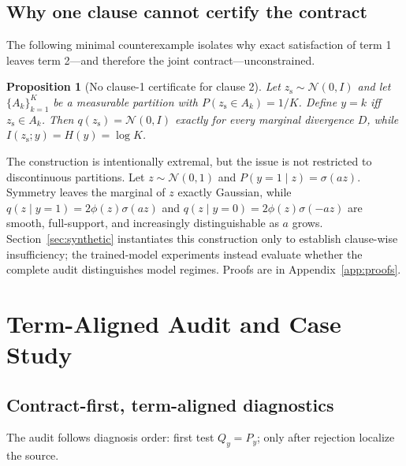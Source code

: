 \documentclass{article}
\newtheorem{proposition}{Proposition}
\newcommand{\zs}{z_{\mathrm{s}}}
\begin{document}
\subsection{Why one clause cannot certify the contract}

The following minimal counterexample isolates why exact satisfaction of term
1 leaves term 2---and therefore the joint contract---unconstrained.

\begin{proposition}[No clause-1 certificate for clause 2]
\label{prop:nocert}
Let $\zs\sim\mathcal N(0,I)$ and let $\{A_k\}_{k=1}^K$ be a measurable
partition with $P(\zs\in A_k)=1/K$.  Define $y=k$ iff $\zs\in A_k$.  Then
$q(\zs)=\mathcal N(0,I)$ exactly for every marginal divergence $D$, while
$I(\zs;y)=H(y)=\log K$.
\end{proposition}

The construction is intentionally extremal, but the issue is not restricted
to discontinuous partitions.  Let $z\sim\mathcal N(0,1)$ and
$P(y=1\mid z)=\sigma(az)$.  Symmetry leaves the marginal of $z$ exactly
Gaussian, while $q(z\mid y=1)=2\phi(z)\sigma(az)$ and
$q(z\mid y=0)=2\phi(z)\sigma(-az)$ are smooth, full-support, and increasingly
distinguishable as $a$ grows.  Section~\ref{sec:synthetic} instantiates this
construction only to establish clause-wise insufficiency; the trained-model
experiments instead evaluate whether the complete audit distinguishes model
regimes.  Proofs are in Appendix~\ref{app:proofs}.

\section{Term-Aligned Audit and Case Study}
\label{sec:protocol}

\subsection{Contract-first, term-aligned diagnostics}

The audit follows diagnosis order: first test $Q_y=P_y$; only after rejection
localize the source.
\end{document}
